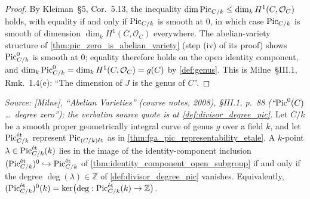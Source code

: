 \begin{proof}
  By Kleiman~\S 5,
  Cor.~5.13, the inequality
  \(\dim \operatorname{Pic}_{C/k} \le \dim_k H^1(C, \mathcal{O}_C)\) holds, with
  equality if and only if \(\operatorname{Pic}_{C/k}\) is smooth at \(0\), in which
  case \(\operatorname{Pic}_{C/k}\) is smooth of dimension \(\dim_k H^1(C,
  \mathcal{O}_C)\) everywhere. The abelian-variety structure of
  \cref{thm:pic_zero_is_abelian_variety} (step (iv) of its proof)
  shows \(\operatorname{Pic}^0_{C/k}\) is smooth at \(0\); equality therefore holds
  on the open identity component, and
  \(\dim_k \operatorname{Pic}^0_{C/k} = \dim_k H^1(C, \mathcal{O}_C) = g(C)\)
  by \cref{def:genus}. This is Milne~\S III.1, Rmk.~1.4(e): ``The
  dimension of \(J\) is the genus of \(C\)''.
\end{proof}

\begin{theorem}\notready
  \label{thm:pic_zero_k_points_iff_degree_zero}

  \textit{Source: [Milne], ``Abelian Varieties'' (course notes, 2008),
  \S III.1, p.~88 (``\(\operatorname{Pic}^0(C)\)\dots\ degree zero''); the verbatim
  source quote is at \cref{def:divisor_degree_pic}.}
  Let \(C/k\) be a smooth proper geometrically integral curve of genus
  \(g\) over a field \(k\), and let \(\operatorname{Pic}^{\mathrm{\acute{e}t}}_{C/k}\) represent
  \(\operatorname{Pic}_{(C/k)\mathrm{\acute{e}t}}\) as in \cref{thm:fga_pic_representability_etale}. A
  \(k\)-point \(\lambda \in \operatorname{Pic}^{\mathrm{\acute{e}t}}_{C/k}(k)\) lies in the image of the
  identity-component inclusion
  \((\operatorname{Pic}^{\mathrm{\acute{e}t}}_{C/k})^0\hookrightarrow\operatorname{Pic}^{\mathrm{\acute{e}t}}_{C/k}\)
  of \cref{thm:identity_component_open_subgroup}
  if and only if the degree
  \(\deg(\lambda) \in \mathbb{Z}\) of \cref{def:divisor_degree_pic}
  vanishes. Equivalently,
  \((\operatorname{Pic}^{\mathrm{\acute{e}t}}_{C/k})^0(k)
    =\ker\bigl(\deg:\operatorname{Pic}^{\mathrm{\acute{e}t}}_{C/k}(k)\to\mathbb Z\bigr)\).
\end{theorem}

